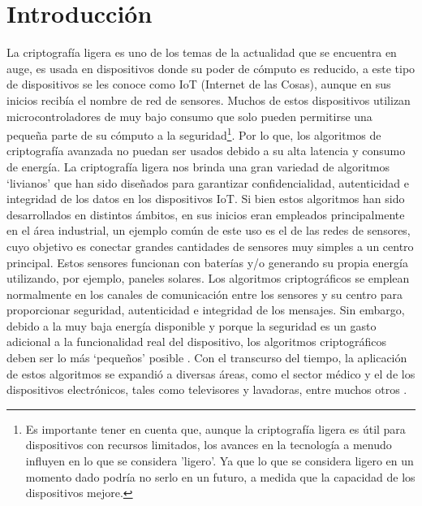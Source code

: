 \documentclass[a4paper,10pt]{article}
\begin{document}
	\section{Introducción}
	\label{seccion1}
	La criptografía ligera es uno de los temas de la actualidad que se encuentra en auge, es usada en dispositivos donde su poder de cómputo es reducido, a este tipo de dispositivos se les conoce como IoT (Internet de las Cosas), aunque en sus inicios recibía el nombre de red de sensores. Muchos de estos dispositivos utilizan microcontroladores de muy bajo consumo que solo pueden permitirse una pequeña parte de su cómputo a la seguridad\footnote{Es importante tener en cuenta que, aunque la criptografía ligera es útil para dispositivos con recursos limitados, los avances en la tecnología a menudo influyen en lo que se considera 'ligero'. Ya que lo que se considera ligero en un momento dado podría no serlo en un futuro, a medida que la capacidad de los dispositivos mejore.}. Por lo que, los algoritmos de criptografía avanzada no puedan ser usados debido a su alta latencia y consumo de energía. La criptografía ligera nos brinda una gran variedad de algoritmos ‘livianos’ que han sido diseñados para garantizar confidencialidad, autenticidad e integridad de los datos en los dispositivos IoT. Si bien estos algoritmos han sido desarrollados en distintos ámbitos, en sus inicios eran empleados principalmente en el área industrial, un ejemplo común de este uso es el de las redes de sensores, cuyo objetivo es conectar grandes cantidades de sensores muy simples a un centro principal. Estos sensores funcionan con baterías y/o generando su propia energía utilizando, por ejemplo, paneles solares. Los algoritmos criptográficos se emplean normalmente en los canales de comunicación entre los sensores y su centro para proporcionar seguridad, autenticidad e integridad de los mensajes. Sin embargo, debido a la muy baja energía disponible y porque la seguridad es un gasto adicional a la funcionalidad real del dispositivo, los algoritmos criptográficos deben ser lo más ‘pequeños’ posible \parencite[1]{biryukov2017state}. Con el transcurso del tiempo, la aplicación de estos algoritmos se expandió a diversas áreas, como el sector médico y el de los dispositivos electrónicos, tales como televisores y lavadoras, entre muchos otros \parencite{thakor2020lightweight}.
	
\end{document}
